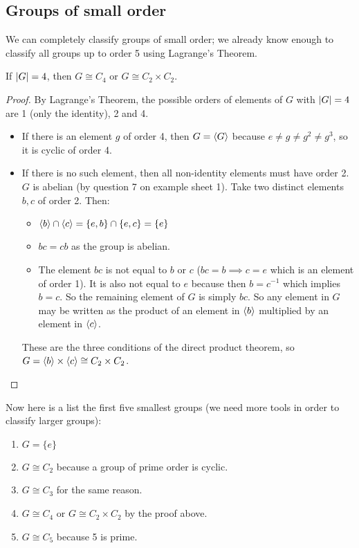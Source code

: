\subsection{Groups of small order}
We can completely classify groups of small order; we already know enough to classify all groups up to order 5 using Lagrange's Theorem.
\begin{proposition}
	If \(\abs{G} = 4\), then \(G \cong C_4\) or \(G \cong C_2 \times C_2\).
\end{proposition}
\begin{proof}
	By Lagrange's Theorem, the possible orders of elements of \(G\) with \(\abs{G} = 4\) are 1 (only the identity), 2 and 4.
	\begin{itemize}
		\item If there is an element \(g\) of order 4, then \(G = \langle{} G \rangle\) because \(e \neq g \neq g^2 \neq g^3\), so it is cyclic of order 4.
		\item If there is no such element, then all non-identity elements must have order 2.
		      \(G\) is abelian (by question 7 on example sheet 1).
		      Take two distinct elements \(b, c\) of order 2.
		      Then:
		      \begin{itemize}
			      \item \(\langle{} b \rangle \cap \langle{} c \rangle = \{ e, b \} \cap \{ e, c \} = \{ e \}\)
			      \item \(bc = cb\) as the group is abelian.
			      \item The element \(bc\) is not equal to \(b\) or \(c\) (\(bc = b \implies c = e\) which is an element of order 1).
			            It is also not equal to \(e\) because then \(b = c^{-1}\) which implies \(b = c\).
			            So the remaining element of \(G\) is simply \(bc\).
			            So any element in \(G\) may be written as the product of an element in \(\langle{} b \rangle\) multiplied by an element in \(\langle{} c \rangle\).
		      \end{itemize}
		      These are the three conditions of the direct product theorem, so \(G = \langle{} b \rangle \times \langle{} c \rangle \cong C_2 \times C_2\).
	\end{itemize}
\end{proof}
Now here is a list the first five smallest groups (we need more tools in order to classify larger groups):
\begin{enumerate}
	\item \(G = \{ e \}\)
	\item \(G \cong C_2\) because a group of prime order is cyclic.
	\item \(G \cong C_3\) for the same reason.
	\item \(G \cong C_4\) or \(G \cong C_2 \times C_2\) by the proof above.
	\item \(G \cong C_5\) because 5 is prime.
\end{enumerate}
